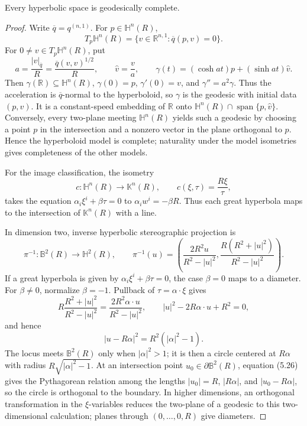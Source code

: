 \begin{theorem}
\label{thm:hyperbolic-geodesically-complete}

Every hyperbolic space is geodesically complete.

\begin{proof}
\sketch Write $\overline q=q^{(n,1)}$. For $p\in\mathbb H^n(R)$,
\[
T_p\mathbb H^n(R)=\{v\in\mathbb R^{n,1}:\overline q(p,v)=0\}.
\]
For $0\ne v\in T_p\mathbb H^n(R)$, put
\[
a=\frac{|v|_{\overline q}}R=\frac{\overline q(v,v)^{1/2}}R,
\qquad \widehat v=\frac va,
\qquad
\gamma(t)=(\cosh at)p+(\sinh at)\widehat v.
\]
Then $\gamma(\mathbb R)\subseteq\mathbb H^n(R)$,
$\gamma(0)=p$, $\gamma'(0)=v$, and $\gamma''=a^2\gamma$. Thus the acceleration
is $\overline q$-normal to the hyperboloid, so $\gamma$ is the geodesic with
initial data $(p,v)$. It is a constant-speed embedding of $\mathbb R$ onto
$\mathbb H^n(R)\cap\operatorname{span}\{p,\widehat v\}$. Conversely, every
two-plane meeting $\mathbb H^n(R)$ yields such a geodesic by choosing a point
$p$ in the intersection and a nonzero vector in the plane orthogonal to $p$.
Hence the hyperboloid model is complete; naturality under the model isometries
gives completeness of the other models.

For the image classification, the isometry
\[
c\colon\mathbb H^n(R)\longrightarrow\mathbb K^n(R),
\qquad c(\xi,\tau)=\frac{R\xi}{\tau},
\]
takes the equation $\alpha_i\xi^i+\beta\tau=0$ to
$\alpha_iw^i=-\beta R$. Thus each great hyperbola maps to the intersection of
$\mathbb K^n(R)$ with a line.

In dimension two, inverse hyperbolic stereographic projection is
\[
\pi^{-1}\colon\mathbb B^2(R)\longrightarrow\mathbb H^2(R),
\qquad
\pi^{-1}(u)=\left(
\frac{2R^2u}{R^2-|u|^2},
\frac{R(R^2+|u|^2)}{R^2-|u|^2}
\right).
\]
If a great hyperbola is given by $\alpha_i\xi^i+\beta\tau=0$, the case
$\beta=0$ maps to a diameter. For $\beta\ne0$, normalize $\beta=-1$. Pullback
of $\tau=\alpha\mathbin\cdot\xi$ gives
\[
R\frac{R^2+|u|^2}{R^2-|u|^2}
=\frac{2R^2\alpha\mathbin\cdot u}{R^2-|u|^2},
\qquad
|u|^2-2R\alpha\mathbin\cdot u+R^2=0,
\]
and hence
\begin{equation}
|u-R\alpha|^2=R^2(|\alpha|^2-1). \tag{5.26}
\end{equation}
The locus meets $\mathbb B^2(R)$ only when $|\alpha|^2>1$; it is then a
circle centered at $R\alpha$ with radius $R\sqrt{|\alpha|^2-1}$. At an
intersection point $u_0\in\partial\mathbb B^2(R)$, equation (5.26) gives the
Pythagorean relation among the lengths $|u_0|=R$, $|R\alpha|$, and
$|u_0-R\alpha|$, so the circle is orthogonal to the boundary. In higher
dimensions, an orthogonal transformation in the $\xi$-variables reduces the
two-plane of a geodesic to this two-dimensional calculation; planes through
$(0,\ldots,0,R)$ give diameters.


\end{proof}
\end{theorem}
